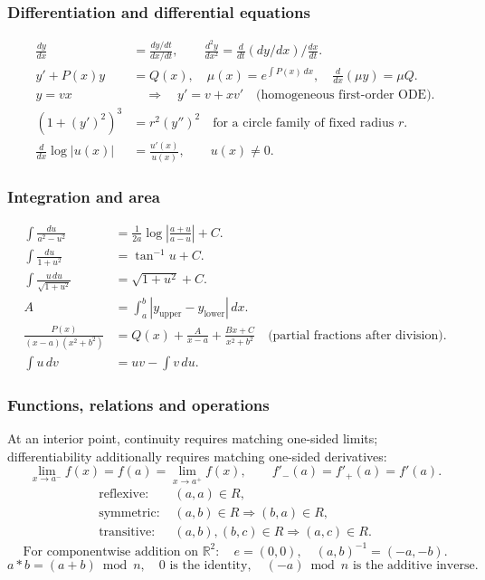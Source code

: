 \subsubsection{Differentiation and differential equations}
\begin{align}
\frac{dy}{dx}&=\frac{dy/dt}{dx/dt},\qquad \frac{d^2y}{dx^2}=\frac{d}{dt}(dy/dx)\bigg/\frac{dx}{dt}. \tag{1.3.1.1}\\
 y'+P(x)y&=Q(x),\quad \mu(x)=e^{\int P(x)\,dx},\quad \frac{d}{dx}(\mu y)=\mu Q. \tag{1.3.1.2}\\
y=vx&\quad\Longrightarrow\quad y'=v+xv'\quad\text{(homogeneous first-order ODE)}. \tag{1.3.1.3}\\
(1+(y')^2)^3&=r^2(y'')^2\quad\text{for a circle family of fixed radius }r. \tag{1.3.1.4}\\
\frac{d}{dx}\log|u(x)|&=\frac{u'(x)}{u(x)},\qquad u(x)\ne0. \tag{1.3.1.5}
\end{align}

\subsubsection{Integration and area}
\begin{align}
\int\frac{du}{a^2-u^2}&=\frac1{2a}\log\left|\frac{a+u}{a-u}\right|+C. \tag{1.4.1.1}\\
\int\frac{du}{1+u^2}&=\tan^{-1}u+C. \tag{1.4.1.2}\\
\int\frac{u\,du}{\sqrt{1+u^2}}&=\sqrt{1+u^2}+C. \tag{1.4.1.3}\\
A&=\int_a^b |y_{\mathrm{upper}}-y_{\mathrm{lower}}|\,dx. \tag{1.4.1.4}\\
\frac{P(x)}{(x-a)(x^2+b^2)}&=Q(x)+\frac{A}{x-a}+\frac{Bx+C}{x^2+b^2}\quad\text{(partial fractions after division)}. \tag{1.4.1.5}\\
\int u\,dv&=uv-\int v\,du. \tag{1.4.1.6}
\end{align}

\subsubsection{Functions, relations and operations}
At an interior point, continuity requires matching one-sided limits; differentiability additionally requires matching one-sided derivatives:
\[\lim_{x\to a^-}f(x)=f(a)=\lim_{x\to a^+}f(x),\qquad f'_{-}(a)=f'_{+}(a)=f'(a).\tag{1.5.1.1}\]
\[
\begin{aligned}
\text{reflexive: }&(a,a)\in R,\\
\text{symmetric: }&(a,b)\in R\Rightarrow(b,a)\in R,\\
\text{transitive: }&(a,b),(b,c)\in R\Rightarrow(a,c)\in R.
\end{aligned}\tag{1.5.1.2}
\]
\[\text{For componentwise addition on }\mathbb R^2:\quad e=(0,0),\quad (a,b)^{-1}=(-a,-b).\tag{1.5.1.3}\]
\[a*b=(a+b)\bmod n,\quad 0\text{ is the identity},\quad (-a)\bmod n\text{ is the additive inverse}.\tag{1.5.1.4}\]

